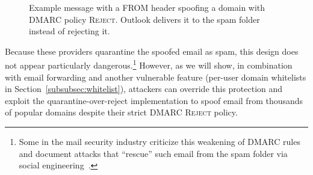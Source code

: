 \begin{figure}[t]
    \centering
{
    \setlength{\fboxsep}{0pt}
    \setlength{\fboxrule}{0.5pt}
}
    \caption{Example message with a FROM header spoofing a domain with DMARC policy \textsc{Reject}.  Outlook delivers it to the spam folder instead of rejecting it.
    }
    \label{fig:example_ms_not_rejecting}
    \end{figure}

%

Because these providers quarantine the spoofed email as spam, this
design does not appear particularly dangerous.\footnote{Some in the
  mail security industry criticize this weakening of DMARC
  rules and document attacks that ``rescue'' such email from the spam folder via social engineering~\cite{Microsof7:online,Spearphi83:online}.} However, as we
will show, in combination with email forwarding and another
vulnerable feature (per-user domain whitelists in Section~\ref{subsubsec:whitelist}), attackers can override this
protection and exploit the quarantine-over-reject implementation to spoof
email from thousands of popular domains despite their strict
DMARC \textsc{Reject} policy.


